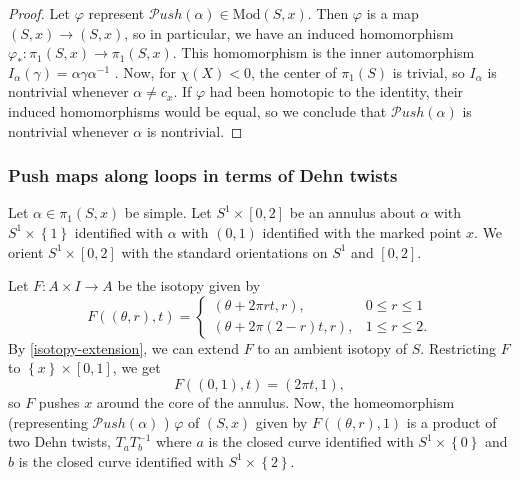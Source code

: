 \documentclass[reqno]{amsart}
\theoremstyle{definition}
\theoremstyle{remark}
\newcommand{\Mod}{{\mathrm{Mod}}}
\newcommand{\Push}{{\mathcal{P}}ush}
\begin{document}
 \begin{proof}
     Let $\varphi $ represent 
     $\Push \left( \alpha \right) \in 
     \Mod \left( S,x \right) $. Then
     $\varphi $ is a map
     $\left( S,x \right) \to \left( S,x \right) $, so
     in particular, we have an induced homomorphism
     $\varphi_* \colon \pi_1 \left( S,x \right) 
     \to \pi_1 \left( S,x \right) $.
     This homomorphism is the inner automorphism
     $I_{\alpha} (\gamma) = \alpha \gamma \alpha^{-1}$ .
     Now, for $\chi (X) < 0$, the center of $\pi_1 (S)$ is
     trivial, so $I_{\alpha}$ is nontrivial whenever
     $\alpha \neq c_{x}$. If $\varphi $ had been
     homotopic to the identity, their
     induced homomorphisms would be equal, so we conclude
     that $\Push \left( \alpha \right) $ is nontrivial whenever
     $\alpha$ is nontrivial.
 \end{proof}

 \subsubsection{Push maps along loops in terms of Dehn twists}

 Let $\alpha \in \pi_1 \left( S,x \right) $ be simple.
 Let $S^{1} \times \left[ 0,2 \right] $ be an annulus
 about $\alpha$ with $S^{1} \times \left\{ 1 \right\} $ 
 identified with $\alpha$ with
 $(0,1)$ identified with the marked point
 $x$. We orient 
 $S^{1} \times \left[ 0,2 \right] $ with the
 standard orientations on
 $S^{1}$ and $\left[ 0,2 \right] $. 

 Let $F \colon A \times I \to A$ be the
 isotopy given by
 \[
 F \left( \left( \theta,r \right) ,t \right) 
 = 
 \begin{cases}
     \left( \theta + 2\pi r t, r \right) ,& 0 \le r \le 1\\
     \left( \theta + 2 \pi (2-r)t,r \right) ,& 1 \le r \le 2.
 \end{cases}
 \]
 By \ref{isotopy-extension}, we can extend
 $F$ to an ambient isotopy of $S$. Restricting
 $F$ to $\left\{ x \right\} \times \left[ 0,1 \right] $, we
 get
 \[
 F\left( (0,1),t \right) = \left( 2 \pi t,1 \right),
 \] 
 so $F$ pushes $x$ around the core of the annulus.
 Now, the homeomorphism (representing $\Push\left( \alpha \right) $ )
 $\varphi $ of $\left( S,x \right) $ given by
 $F\left( (\theta, r),1 \right) $ is a product
 of two Dehn twists,  $T_a T_{b}^{-1}$ where
 $a$ is the closed curve identified with
 $S^{1} \times \left\{ 0 \right\} $ and
 $b$ is the closed curve identified with
 $S^{1} \times \left\{ 2 \right\} $.
\end{document}
